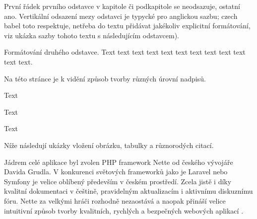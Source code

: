 
První řádek prvního odstavce v kapitole či podkapitole se neodsazuje, ostatní ano. Vertikální odsazení mezy odstavci je typycké pro anglickou sazbu; czech babel toto respektuje, netřeba do textu přidávat jakékoliv explicitní formátování, viz ukázka sazby tohoto textu s následujícím odstavcem).

Formátování druhého odstavce. Text text text text text text text text text text text text.



Na této stránce je k vidění způsob tvorby různých úrovní nadpisů.

Text

Text

Text

Níže následují ukázky vložení obrázku, tabulky a různorodých citací.





Jádrem celé aplikace byl zvolen PHP framework Nette od českého vývojáře Davida Grudla. 
V konkurenci světových frameworků jako je Laravel nebo Symfony je velice oblíbený především v českém prostředí. Zcela jistě i díky kvalitní dokumentaci v češtině, pravidelným aktualizacím i aktivnímu diskuznímu fóru. 
Nette za velkými hráči rozhodně nezaostává a naopak přináší velice intuitivní způsob tvorby kvalitních, rychlých a bezpečných webových aplikací \cite{Haska2016}.





\label{section:DDD}


\label{section:Entity}


